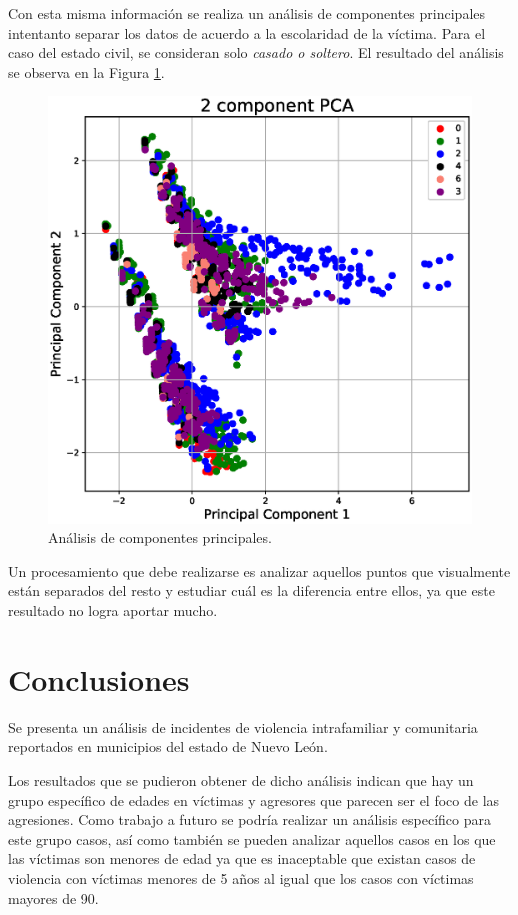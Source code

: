 \documentclass[final,5p,times]{elsarticle}
\begin{document}
Con esta misma informaci\'on se realiza un an\'alisis de componentes principales intentanto separar los datos de acuerdo a la escolaridad de la v\'ictima. Para el caso del estado civil, se consideran solo \textit{casado o soltero}. El resultado del an\'alisis se observa en la Figura \ref{pca}.

\begin{figure}
\centering
\includegraphics[scale=0.4]{pca.eps}
\caption{An\'alisis de componentes principales.}
\label{pca}
\end{figure}

Un procesamiento que debe realizarse es analizar aquellos puntos que visualmente est\'an separados del resto y estudiar cu\'al es la diferencia entre ellos, ya que este resultado no logra aportar mucho.

\section{Conclusiones} \label{conclusiones}

Se presenta un an\'alisis de incidentes de violencia intrafamiliar y comunitaria reportados en municipios del estado
de Nuevo Le\'on. 

Los resultados que se pudieron obtener de dicho an\'alisis indican que hay un grupo espec\'ifico de edades en v\'ictimas y agresores que parecen ser el foco de las agresiones. Como trabajo a futuro se podr\'ia realizar un an\'alisis espec\'ifico para este grupo casos, as\'i como tambi\'en se pueden analizar aquellos casos en los que las v\'ictimas son menores de edad ya que es inaceptable que existan casos de violencia con v\'ictimas menores de 5 a\~nos al igual que los casos con v\'ictimas mayores de 90.
\end{document}
